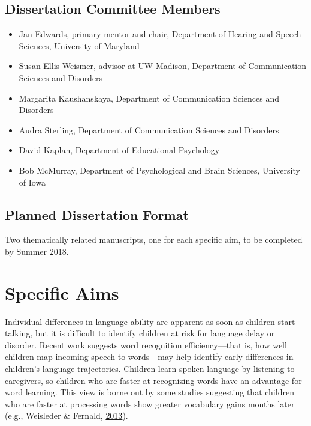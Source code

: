 \documentclass [11pt, proquest] {uwthesis}[2015/03/03]
\begin{document}
\section*{Dissertation Committee Members}\label{committee-members}
\begin{itemize}
\item
  Jan Edwards, primary mentor and chair, Department of Hearing and
  Speech Sciences, University of Maryland
\item
  Susan Ellis Weismer, advisor at UW-Madison, Department of
  Communication Sciences and Disorders
\item
  Margarita Kaushanskaya, Department of Communication Sciences and
  Disorders
\item
  Audra Sterling, Department of Communication Sciences and Disorders
\item
  David Kaplan, Department of Educational Psychology
\item
  Bob McMurray, Department of Psychological and Brain Sciences,
  University of Iowa
\end{itemize}
\section*{Planned Dissertation
Format}\label{planned-dissertation-format}

Two thematically related manuscripts, one for each specific aim, to be
completed by Summer 2018.

\chapter{Specific Aims}\label{specific-aims}

Individual differences in language ability are apparent as soon as
children start talking, but it is difficult to identify children at risk
for language delay or disorder. Recent work suggests word recognition
efficiency---that is, how well children map incoming speech to
words---may help identify early differences in children's language
trajectories. Children learn spoken language by listening to caregivers,
so children who are faster at recognizing words have an advantage for
word learning. This view is borne out by some studies suggesting that
children who are faster at processing words show greater vocabulary
gains months later (e.g., Weisleder \& Fernald,
\protect\hyperlink{ref-Weisleder2013}{2013}).
\end{document}
